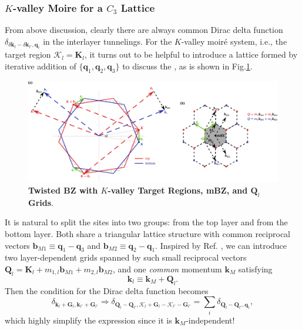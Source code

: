 \subsubsection{$K$-valley Moire for a $C_3$ Lattice}
From above discussion, clearly there are always common Dirac delta function $\delta_{\delta\bm k_l-\delta\bm k_{l'},\bm q_i}$ in the interlayer tunnelings. For the $K$-valley moir\'e system, i.e., the target region $\bm{\mathcal K}_l=\bm K_l$, it turns out to be helpful to introduce a lattice formed by iterative addition of $\{\bm q_1,\bm q_2,\bm q_3\}$ to discuss the , as is shown in Fig.\ref{fig:tBLG_geometry_new}.
\begin{figure}[!htp]
    \centering
    \includegraphics[width=1.0\textwidth]{figures/tBLG_geometry_new.pdf}
    \caption{\textbf{Twisted BZ with $K$-valley Target Regions, mBZ, and $\bm Q_l$ Grids}.}
    \label{fig:tBLG_geometry_new}
\end{figure}
It is natural to split the sites into two groups: from the top layer and from the bottom layer. Both share a triangular lattice structure with common reciprocal vectors $\bm b_{M1}\equiv\bm q_1-\bm q_3$ and $\bm b_{M2}\equiv\bm q_2-\bm q_1$. Inspired by Ref. \cite{song2019all}, we can introduce two layer-dependent grids spanned by such small reciprocal vectors $\bm Q_l=\bm K_l+m_{1,l}\bm b_{M1}+m_{2,l}\bm b_{M2}$, and one \emph{common} momentum $\bm k_M$ satisfying
\begin{equation*}
    \bm k_l\equiv\bm k_M+\bm Q_{l}.
\end{equation*}
Then the condition for the Dirac delta function becomes
\begin{equation*}
    \delta_{\bm k_l+\bm G_l,\bm k_{l'}+\bm G_{l'}}\Rightarrow\delta_{\bm Q_l-\bm Q_{l'},\bm{\mathcal K}_l+\bm G_l-\bm{\mathcal K}_{l'}-\bm G_{l'}}=\sum_i\delta_{\bm Q_l-\bm Q_{l'},\bm q_i},
\end{equation*}
which highly simplify the expression since it is $\bm k_M$-independent!




